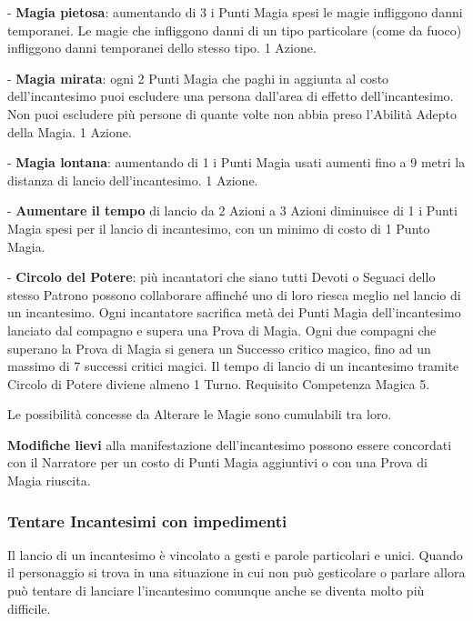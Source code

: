 \begin{multicols}{2}
- \textbf{Magia pietosa}: aumentando di 3 i Punti Magia spesi le magie infliggono danni temporanei. Le magie che infliggono danni di un tipo particolare (come da fuoco) infliggono danni temporanei dello stesso tipo. 1 Azione.

- \textbf{Magia mirata}: ogni 2 Punti Magia che paghi in aggiunta al costo dell'incantesimo puoi escludere una persona dall'area di effetto dell'incantesimo. Non puoi escludere più persone di quante volte non abbia preso l'Abilità Adepto della Magia. 1 Azione. %

- \textbf{Magia lontana}: aumentando di 1 i Punti Magia usati aumenti fino a 9 metri la distanza di lancio dell'incantesimo. 1 Azione.

- \textbf{Aumentare il tempo} di lancio da 2 Azioni a 3 Azioni diminuisce di 1 i Punti Magia spesi per il lancio di incantesimo, con un minimo di costo di 1 Punto Magia.

- \textbf{Circolo del Potere}: più incantatori che siano tutti Devoti o Seguaci dello stesso Patrono possono collaborare affinché uno di loro riesca meglio nel lancio di un incantesimo.
Ogni incantatore sacrifica metà dei Punti Magia dell'incantesimo lanciato dal compagno e supera una Prova di Magia. Ogni due compagni che superano la Prova di Magia si genera un Successo critico magico, fino ad un massimo di 7 successi critici magici. Il tempo di lancio di un incantesimo tramite Circolo di Potere diviene almeno 1 Turno. Requisito Competenza Magica 5.

\medskip

Le possibilità concesse da Alterare le Magie sono cumulabili tra loro.

\medskip

\textbf{Modifiche lievi}  alla manifestazione dell'incantesimo possono essere concordati con il Narratore per un costo di Punti Magia aggiuntivi o con una Prova di Magia riuscita.

\subsubsection{Tentare Incantesimi con impedimenti} \label{magieconimpedimenti}\hypertarget{magieconimpedimenti}{}

Il lancio di un incantesimo è vincolato a gesti e parole particolari e unici. Quando il personaggio si trova in una situazione in cui non può gesticolare o parlare allora può tentare di lanciare l'incantesimo comunque anche se diventa molto più difficile.


\end{multicols}
